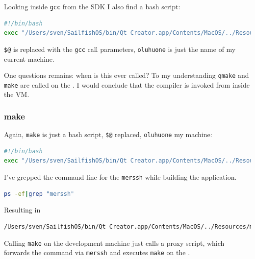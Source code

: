 Looking inside \verb,gcc, from the SDK I also find a bash script:
\begin{lstlisting}[language=bash]
#!/bin/bash
exec "/Users/sven/SailfishOS/bin/Qt Creator.app/Contents/MacOS/../Resources/merssh" -sdktoolsdir "/Users/sven/.config/SailfishAlpha3/mer-sdk-tools/MerSDK" -commandtype sb2 -mertarget SailfishOS-i486-x86 gcc $@oluhuone:SailfishOS-i486-x86
\end{lstlisting}
%
\verb,$@, is replaced with the \verb,gcc, call parameters, \verb,oluhuone, is just the name of my current machine.

One questions remains: when is this ever called? To my understanding \verb,qmake, and \verb,make, are called on the . I would conclude that the compiler is invoked from inside the VM.
%
%
\subsubsection{make}\label{subsubsec:make}
%
Again, \verb,make, is just a bash script, \verb,$@, replaced, \verb,oluhuone, my machine:
%
\begin{lstlisting}[language=bash]
#!/bin/bash
exec "/Users/sven/SailfishOS/bin/Qt Creator.app/Contents/MacOS/../Resources/merssh" -sdktoolsdir "/Users/sven/.config/SailfishAlpha3/mer-sdk-tools/MerSDK" -commandtype mb2 -mertarget SailfishOS-i486-x86 make $@oluhuone:SailfishOS-i486-x86
\end{lstlisting}
%
%
I've grepped the command line for the \verb,merssh, while building the application.
%
\begin{lstlisting}[language=bash]
ps -ef|grep "merssh"
\end{lstlisting}
%
Resulting in
%
\begin{lstlisting}[language=bash]
/Users/sven/SailfishOS/bin/Qt Creator.app/Contents/MacOS/../Resources/merssh -sdktoolsdir /Users/sven/.config/SailfishAlpha3/mer-sdk-tools/MerSDK -commandtype mb2 -mertarget SailfishOS-i486-x86 make
\end{lstlisting}
%
Calling \verb,make, on the development machine just calls a proxy script, which forwards the command via \verb,merssh, and executes \verb,make, on the .
%
%
